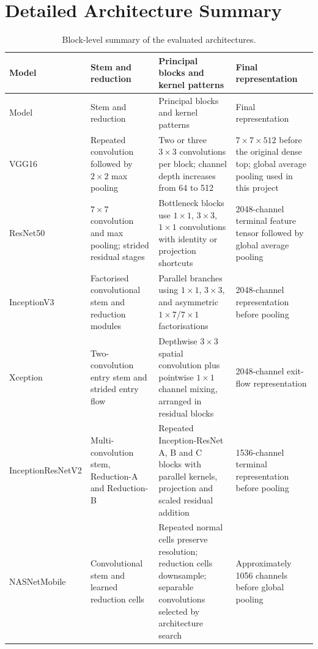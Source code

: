 \chapter{Detailed Architecture Summary}
\label{app:architecture}
\begin{longtable}{p{2.6cm}p{3.2cm}p{4.0cm}p{3.2cm}}
\caption{Block-level summary of the evaluated architectures.}\label{tab:blocksummary}\\
\toprule
Model & Stem and reduction & Principal blocks and kernel patterns & Final representation \\
\midrule
\endfirsthead
\toprule
Model & Stem and reduction & Principal blocks and kernel patterns & Final representation \\
\midrule
\endhead
VGG16 & Repeated convolution followed by $2\times2$ max pooling & Two or three $3\times3$ convolutions per block; channel depth increases from 64 to 512 & $7\times7\times512$ before the original dense top; global average pooling used in this project \\
ResNet50 & $7\times7$ convolution and max pooling; strided residual stages & Bottleneck blocks use $1\times1$, $3\times3$, $1\times1$ convolutions with identity or projection shortcuts & 2048-channel terminal feature tensor followed by global average pooling \\
InceptionV3 & Factorised convolutional stem and reduction modules & Parallel branches using $1\times1$, $3\times3$, and asymmetric $1\times7$/$7\times1$ factorisations & 2048-channel representation before pooling \\
Xception & Two-convolution entry stem and strided entry flow & Depthwise $3\times3$ spatial convolution plus pointwise $1\times1$ channel mixing, arranged in residual blocks & 2048-channel exit-flow representation \\
InceptionResNetV2 & Multi-convolution stem, Reduction-A and Reduction-B & Repeated Inception-ResNet A, B and C blocks with parallel kernels, projection and scaled residual addition & 1536-channel terminal representation before pooling \\
NASNetMobile & Convolutional stem and learned reduction cells & Repeated normal cells preserve resolution; reduction cells downsample; separable convolutions selected by architecture search & Approximately 1056 channels before global pooling \\
\bottomrule
\end{longtable}
